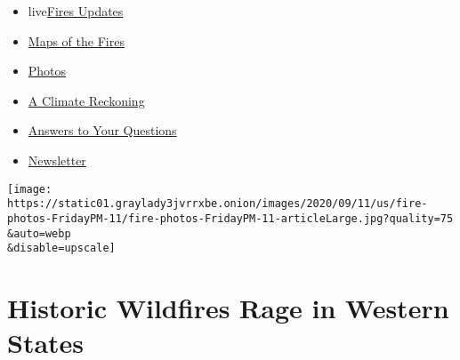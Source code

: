 \begin{itemize}
\tightlist
\item
  live\href{https://www.nytimes3xbfgragh.onion/2020/09/12/us/wildfires-live-updates.html?name=styln-california-wildfires\&region=TOP_BANNER\&block=storyline_menu_recirc\&action=click\&pgtype=Article\&impression_id=f9db9e61-f52b-11ea-ae97-1973f9761e7a\&variant=undefined}{Fires
  Updates}
\item
  \href{https://www.nytimes3xbfgragh.onion/interactive/2020/us/fires-map-tracker.html?name=styln-california-wildfires\&region=TOP_BANNER\&block=storyline_menu_recirc\&action=click\&pgtype=Article\&impression_id=f9dbc570-f52b-11ea-ae97-1973f9761e7a\&variant=undefined}{Maps
  of the Fires}
\item
  \href{https://www.nytimes3xbfgragh.onion/article/wildfires-photos-california-oregon-washington-state.html?name=styln-california-wildfires\&region=TOP_BANNER\&block=storyline_menu_recirc\&action=click\&pgtype=Article\&impression_id=f9dbc571-f52b-11ea-ae97-1973f9761e7a\&variant=undefined}{Photos}
\item
  \href{https://www.nytimes3xbfgragh.onion/2020/09/10/us/climate-change-california-wildfires.html?name=styln-california-wildfires\&region=TOP_BANNER\&block=storyline_menu_recirc\&action=click\&pgtype=Article\&impression_id=f9dbc572-f52b-11ea-ae97-1973f9761e7a\&variant=undefined}{A
  Climate Reckoning}
\item
  \href{https://www.nytimes3xbfgragh.onion/article/wildfires-california-oregon-washington.html?name=styln-california-wildfires\&region=TOP_BANNER\&block=storyline_menu_recirc\&action=click\&pgtype=Article\&impression_id=f9dbc573-f52b-11ea-ae97-1973f9761e7a\&variant=undefined}{Answers
  to Your Questions}
\item
  \href{https://www.nytimes3xbfgragh.onion/2020/09/09/us/california-wildfires.html?name=styln-california-wildfires\&region=TOP_BANNER\&block=storyline_menu_recirc\&action=click\&pgtype=Article\&impression_id=f9dbc574-f52b-11ea-ae97-1973f9761e7a\&variant=undefined}{Newsletter}
\end{itemize}

\texttt{[image: https://static01.graylady3jvrrxbe.onion/images/2020/09/11/us/fire-photos-FridayPM-11/fire-photos-FridayPM-11-articleLarge.jpg?quality=75\\\&auto=webp\\\&disable=upscale]}

\hypertarget{historic-wildfires-rage-in-western-states}{%
\section{Historic Wildfires Rage in Western
States}\label{historic-wildfires-rage-in-western-states}}

